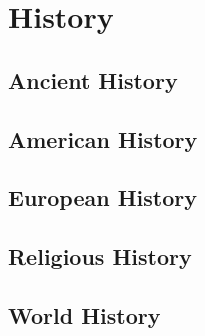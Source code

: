 \chapter{History}
	\section{Ancient History}
	\section{American History}
	\section{European History}
	\section{Religious History}
	\section{World History}
	